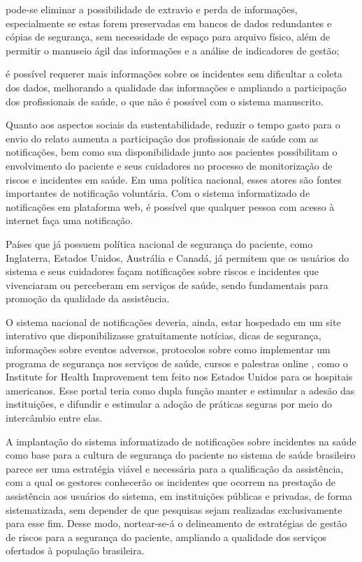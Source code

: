 \documentclass{article}
\begin{document}
pode-se eliminar a possibilidade de extravio e perda de informações,
especialmente se
estas forem preservadas em bancos de dados redundantes e cópias de segurança,
sem
necessidade de espaço para arquivo físico, além de permitir o manuseio ágil das
informações e a análise de indicadores de gestão;

é possível requerer mais informações sobre os incidentes sem dificultar a coleta
dos
dados, melhorando a qualidade das informações e ampliando a participação dos
profissionais de saúde, o que não é possível com o sistema manuscrito.

Quanto aos aspectos sociais da sustentabilidade, reduzir o tempo gasto para o
envio do
relato aumenta a participação dos profissionais de saúde com as notificações,
bem como sua
disponibilidade junto aos pacientes possibilitam o envolvimento do paciente e
seus
cuidadores no processo de monitorização de riscos e incidentes em saúde. Em uma
política
nacional, esses atores são fontes importantes de notificação voluntária. Com o
sistema
informatizado de notificações em plataforma web, é possível que qualquer pessoa
com acesso à
internet faça uma notificação.

Países que já possuem política nacional de segurança do paciente, como
Inglaterra, Estados
Unidos, Austrália e Canadá, já permitem que os usuários do sistema e seus
cuidadores façam
notificações sobre riscos e incidentes que vivenciaram ou perceberam em serviços
de saúde,
sendo fundamentais para promoção da qualidade da assistência.

O sistema nacional de notificações deveria, ainda, estar hospedado em um site
interativo
que disponibilizasse gratuitamente notícias, dicas de segurança, informações
sobre eventos
adversos, protocolos sobre como implementar um programa de segurança nos
serviços de saúde,
cursos e palestras online , como o Institute for Health
Improvement tem feito nos Estados Unidos para os hospitais americanos. Esse
portal teria como dupla função manter e estimular a adesão das instituições, e
difundir e
estimular a adoção de práticas seguras por meio do intercâmbio entre elas.

A implantação do sistema informatizado de notificações sobre incidentes na saúde
como base
para a cultura de segurança do paciente no sistema de saúde brasileiro parece
ser uma
estratégia viável e necessária para a qualificação da assistência, com a qual os
gestores
conhecerão os incidentes que ocorrem na prestação de assistência aos usuários do
sistema, em
instituições públicas e privadas, de forma sistematizada, sem depender de que
pesquisas
sejam realizadas exclusivamente para esse fim. Desse modo, nortear-se-á o
delineamento de
estratégias de gestão de riscos para a segurança do paciente, ampliando a
qualidade dos
serviços ofertados à população brasileira.
\end{document}
